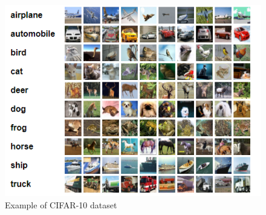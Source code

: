\begin{figure}[h]
	\includegraphics[scale=0.5]{figures/cifar10}
	\centering
	\caption{Example of CIFAR-10 dataset \cite{krizhevsky2009learning}}
	\label{fig:cifar10}
\end{figure}



